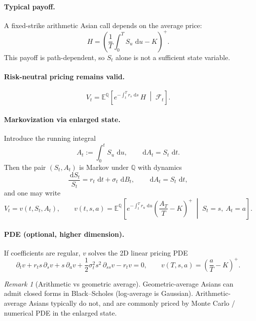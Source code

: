 \documentclass[11pt]{article}
\newcommand{\F}{\mathcal{F}}
\newcommand{\Qbb}{\mathbb{Q}}
\newcommand{\E}{\mathbb{E}}
\newcommand{\dd}{\,\mathrm{d}}
\newcommand{\1}{\mathbf{1}}
\theoremstyle{plain}
\theoremstyle{definition}
\theoremstyle{remark}
\newtheorem{remark}[theorem]{Remark}
\begin{document}
\paragraph{Typical payoff.}
A fixed-strike arithmetic Asian call depends on the average price:
\[
H=\left(\frac{1}{T}\int_0^T S_u\,\dd u - K\right)^+.
\]
This payoff is path-dependent, so $S_t$ alone is not a sufficient state variable.

\paragraph{Risk-neutral pricing remains valid.}
\[
\boxed{
\;
V_t
=
\E^{\Qbb}\!\left[e^{-\int_t^T r_s\,\dd s}\,H\;\middle|\;\F_t\right].
\;}
\]

\paragraph{Markovization via enlarged state.}
Introduce the running integral
\[
A_t:=\int_0^t S_u\,\dd u,
\qquad \dd A_t = S_t\,\dd t.
\]
Then the pair $(S_t,A_t)$ is Markov under $\Qbb$ with dynamics
\[
\frac{\dd S_t}{S_t}=r_t\,\dd t+\sigma_t\,\dd B_t,
\qquad
\dd A_t=S_t\,\dd t,
\]
and one may write
\[
V_t = v(t,S_t,A_t),
\qquad
v(t,s,a)
=
\E^{\Qbb}\!\left[
e^{-\int_t^T r_u\,\dd u}
\left(\frac{A_T}{T}-K\right)^+
\;\middle|\; S_t=s,\ A_t=a
\right].
\]

\paragraph{PDE (optional, higher dimension).}
If coefficients are regular, $v$ solves the 2D linear pricing PDE
\[
\partial_t v + r_t s\,\partial_s v + s\,\partial_a v
+\frac12\sigma_t^2 s^2\,\partial_{ss}v - r_t v = 0,
\qquad
v(T,s,a)=\left(\frac{a}{T}-K\right)^+.
\]

\begin{remark}[Arithmetic vs geometric average]
Geometric-average Asians can admit closed forms in Black--Scholes (log-average is Gaussian).
Arithmetic-average Asians typically do not, and are commonly priced by Monte Carlo / numerical PDE in the enlarged state.
\end{remark}
\end{document}
